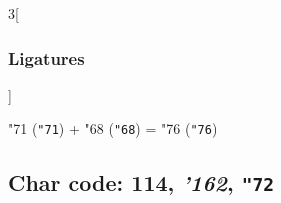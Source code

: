 \documentclass{article}
\newlength{\maxcharwidth}
\begin{document}
\begin{multicols}{3}[\subsubsection{Ligatures}]

{\testfont\char"71\noboundary} ({\tt"71}) + {\testfont\char"68\noboundary} ({\tt"68}) = {\testfont\char"76\noboundary} ({\tt"76}) 

\end{multicols}

\subsection{Char code: 114, {\it'162}, {\tt"72}}
\label{char_114}

\end{document}
